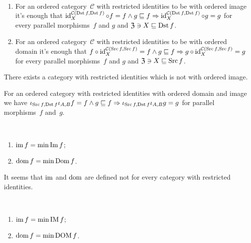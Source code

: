 \begin{obvious}
~
\begin{enumerate}
\item For an ordered category~$\mathcal{C}$ with restricted identities
to be with ordered image it's enough that
$\operatorname{id}^{\mathcal{C}(\operatorname{Dst} f,\operatorname{Dst} f)}_X\circ f=f\land
g\sqsubseteq f\Rightarrow
\operatorname{id}^{\mathcal{C}(\operatorname{Dst} f,\operatorname{Dst} f)}_X\circ g=g$
for every parallel morphisms~$f$ and $g$ and
$\mathfrak{Z}\ni X\sqsubseteq\operatorname{Dst} f$.
\item For an ordered category~$\mathcal{C}$ with restricted identities
to be with ordered domain it's enough that
$f\circ\operatorname{id}^{\mathcal{C}(\operatorname{Src} f,\operatorname{Src} f)}_X=f\land
g\sqsubseteq f\Rightarrow
g\circ\operatorname{id}^{\mathcal{C}(\operatorname{Src} f,\operatorname{Src} f)}_X=g$
for every parallel morphisms~$f$ and $g$ and
$\mathfrak{Z}\ni X\sqsubseteq\operatorname{Src} f$.
\end{enumerate}
\end{obvious}

\begin{conjecture}
There exists a category with restricted identities which
is not with ordered image.
\end{conjecture}

\begin{obvious}
For an ordered category with restricted identities with
ordered domain and image we have
$\iota_{\operatorname{Src} f,\operatorname{Dst} f}\iota_{A,B}f=f\land g\sqsubseteq f
\Rightarrow
\iota_{\operatorname{Src} f,\operatorname{Dst} f}\iota_{A,B}g=g$
for parallel morphisms~$f$ and~$g$.
\end{obvious}

\begin{defn}
~
\begin{enumerate}
\item $\operatorname{im} f = \min\operatorname{Im} f$;
\item $\operatorname{dom} f = \min\operatorname{Dom} f$.
\end{enumerate}
\end{defn}

\begin{note}
It seems that $\operatorname{im}$ and $\operatorname{dom}$ are defined not for every
category with restricted identities.
\end{note}

\begin{prop}
~
\begin{enumerate}
\item $\operatorname{im} f = \min\operatorname{IM} f$;
\item $\operatorname{dom} f = \min\operatorname{DOM} f$.
\end{enumerate}
\end{prop}

